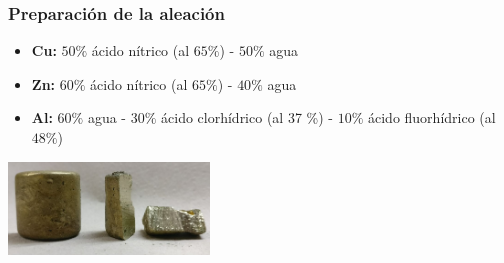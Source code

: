 \documentclass[usenames,dvipsnames]{beamer}
\begin{document}



\begin{frame}
 
 \frametitle{Preparación de la aleación}
 
 \begin{itemize}
 \item \textbf{Cu:} $50 \%$ ácido nítrico (al $65 \%$) - $50 \%$ agua
 \item \textbf{Zn:} $60 \%$ ácido nítrico (al $65 \%$) - $40 \%$ agua
 \item \textbf{Al:} $60 \%$ agua - $30 \%$ ácido clorhídrico (al 37 \%) - $10 \%$ ácido fluorhídrico (al $48 \%$)
\end{itemize}

\vfill

\begin{center}
\includegraphics[width=0.4\textwidth]{img/proceso/lingote.jpg}
\end{center}
\end{frame}
\end{document}
